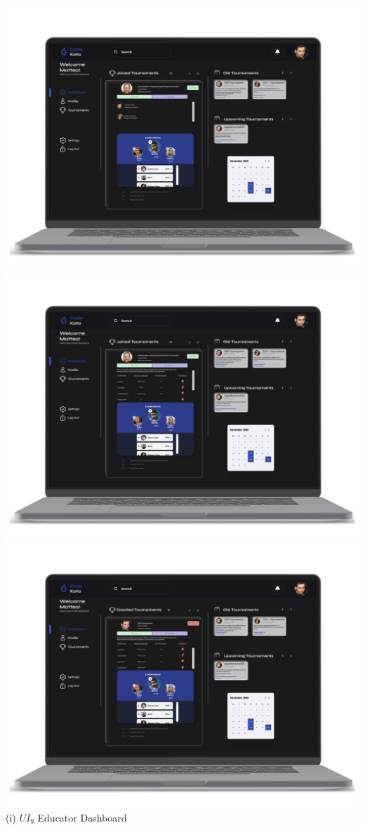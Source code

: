 \begin{center}
\includegraphics[scale=0.13]{Images/ui-ux/educator_dashboard_1.png}
\includegraphics[scale=0.13]{Images/ui-ux/educator_dashboard_2.png}
\includegraphics[scale=0.13]{Images/ui-ux/educator_dashboard_3.png}
\\ (i) $UI_{9}$  Educator Dashboard
\end{center}
